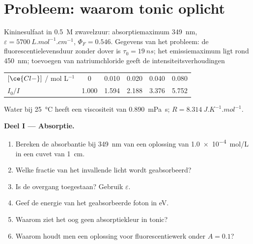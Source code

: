 \section{Probleem: waarom tonic oplicht}

\begin{problem}
\label{pb:b3:electronic-spectroscopy:1}
Kininesulfaat in \qty{0.5}{M} zwavelzuur: absorptiemaximum \qty{349}{nm},
$\varepsilon = \qty{5700}{L.mol^{-1}.cm^{-1}}$, $\Phi_F = 0.546$. Gegevens van het
probleem: de fluorescentielevensduur zonder dover is $\tau_0 = \qty{19}{ns}$; het
emissiemaximum ligt rond \qty{450}{nm}; toevoegen van natriumchloride geeft de
intensiteitsverhoudingen
\begin{center}\small
\begin{tabular}{lccccc}
\hline
$[\ce{Cl-}]$ / mol L$^{-1}$ & 0 & 0.010 & 0.020 & 0.040 & 0.080 \\
$I_0/I$ & 1.000 & 1.594 & 2.188 & 3.376 & 5.752 \\ \hline
\end{tabular}
\end{center}
Water bij \qty{25}{\celsius} heeft een viscositeit van \qty{0.890}{mPa.s}; $R =
\qty{8.314}{J.K^{-1}.mol^{-1}}$.

\medskip\noindent\textbf{Deel I --- Absorptie.}
\begin{enumerate}
  \item Bereken de absorbantie bij \qty{349}{nm} van een oplossing van
        \qty{1.0e-4}{mol/L} in een cuvet van
        \qty{1}{cm}.
  \item Welke fractie van het invallende licht wordt geabsorbeerd?
  \item Is de overgang toegestaan? Gebruik $\varepsilon$.
  \item Geef de energie van het geabsorbeerde foton in eV.
  \item Waarom ziet het oog geen absorptiekleur in tonic?
  \item Waarom houdt men een oplossing voor fluorescentiewerk onder $A = 0.1$?
\end{enumerate}


\end{problem}

